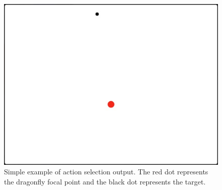 \documentclass[a4paper,11pt]{article}
\begin{document}
\begin{figure}[H]
\centering
\includegraphics[scale = 0.3]{as_example}
\caption{Simple example of action selection output. The red dot represents the dragonfly focal point and the black dot represents the target.}
\end{figure}
\end{document}

